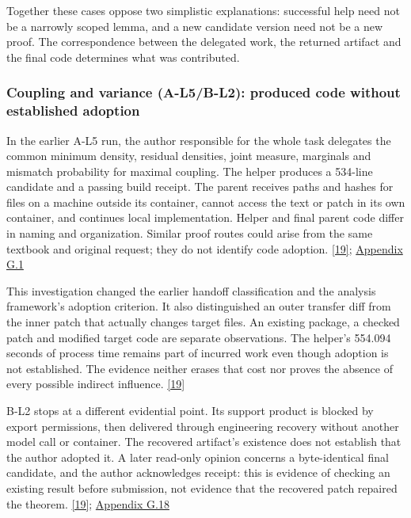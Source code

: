 Together these cases oppose two simplistic explanations: successful help need not be a narrowly scoped lemma, and a new candidate version need not be a new proof. The correspondence between the delegated work, the returned artifact and the final code determines what was contributed.

\subsubsection[Coupling and variance (A-L5/B-L2): produced code without established adoption]{\texorpdfstring{\protect\hypertarget{r2-5}{}Coupling and variance (A-L5/B-L2): produced code without established adoption}{Coupling and variance (A-L5/B-L2): produced code without established adoption}}
In the earlier A-L5 run, the author responsible for the whole task delegates the common minimum density, residual densities, joint measure, marginals and mismatch probability for maximal coupling. The helper produces a 534-line candidate and a passing build receipt. The parent receives paths and hashes for files on a machine outside its container, cannot access the text or patch in its own container, and continues local implementation. Helper and final parent code differ in naming and organization. Similar proof routes could arise from the same textbook and original request; they do not identify code adoption. \href{en.pdf\#ref-19}{\mbox{[19]}}; \href{en-appendix.pdf\#g1}{Appendix G.1}

This investigation changed the earlier handoff classification and the analysis framework's adoption criterion. It also distinguished an outer transfer diff from the inner patch that actually changes target files. An existing package, a checked patch and modified target code are separate observations. The helper's 554.094 seconds of process time remains part of incurred work even though adoption is not established. The evidence neither erases that cost nor proves the absence of every possible indirect influence. \href{en.pdf\#ref-19}{\mbox{[19]}}

B-L2 stops at a different evidential point. Its support product is blocked by export permissions, then delivered through engineering recovery without another model call or container. The recovered artifact's existence does not establish that the author adopted it. A later read-only opinion concerns a byte-identical final candidate, and the author acknowledges receipt: this is evidence of checking an existing result before submission, not evidence that the recovered patch repaired the theorem. \href{en.pdf\#ref-19}{\mbox{[19]}}; \href{en-appendix.pdf\#g18}{Appendix G.18}

